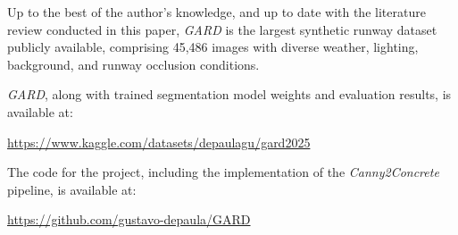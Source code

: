 Up to the best of the author's knowledge, and up to date with the literature review conducted in this paper,
\emph{GARD} is the largest synthetic runway dataset publicly available, comprising 45,486 images with diverse
weather, lighting, background, and runway occlusion conditions.

\emph{GARD}, along with trained segmentation model weights and evaluation results, is available at:
\begin{center}
\url{https://www.kaggle.com/datasets/depaulagu/gard2025}
\end{center}

The code for the project, including the implementation of the \emph{Canny2Concrete} pipeline, is available at:
\begin{center}
\url{https://github.com/gustavo-depaula/GARD}
\end{center}


\endgroup

